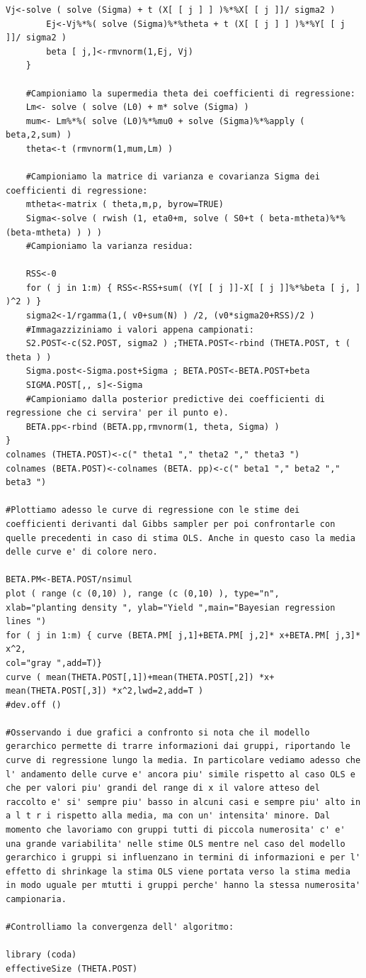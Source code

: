 \begin{lstlisting}[style=R]
        Vj<-solve ( solve (Sigma) + t (X[ [ j ] ] )%*%X[ [ j ]]/ sigma2 )
        Ej<-Vj%*%( solve (Sigma)%*%theta + t (X[ [ j ] ] )%*%Y[ [ j ]]/ sigma2 )
        beta [ j,]<-rmvnorm(1,Ej, Vj)
    }

    #Campioniamo la supermedia theta dei coefficienti di regressione:
    Lm<- solve ( solve (L0) + m* solve (Sigma) )
    mum<- Lm%*%( solve (L0)%*%mu0 + solve (Sigma)%*%apply ( beta,2,sum) )
    theta<-t (rmvnorm(1,mum,Lm) )

    #Campioniamo la matrice di varianza e covarianza Sigma dei coefficienti di regressione:
    mtheta<-matrix ( theta,m,p, byrow=TRUE)
    Sigma<-solve ( rwish (1, eta0+m, solve ( S0+t ( beta-mtheta)%*%(beta-mtheta) ) ) )
    #Campioniamo la varianza residua:

    RSS<-0
    for ( j in 1:m) { RSS<-RSS+sum( (Y[ [ j ]]-X[ [ j ]]%*%beta [ j, ] )^2 ) }
    sigma2<-1/rgamma(1,( v0+sum(N) ) /2, (v0*sigma20+RSS)/2 )
    #Immagazziziniamo i valori appena campionati:
    S2.POST<-c(S2.POST, sigma2 ) ;THETA.POST<-rbind (THETA.POST, t ( theta ) )
    Sigma.post<-Sigma.post+Sigma ; BETA.POST<-BETA.POST+beta
    SIGMA.POST[,, s]<-Sigma
    #Campioniamo dalla posterior predictive dei coefficienti di regressione che ci servira' per il punto e).
    BETA.pp<-rbind (BETA.pp,rmvnorm(1, theta, Sigma) )
}
colnames (THETA.POST)<-c(" theta1 "," theta2 "," theta3 ")
colnames (BETA.POST)<-colnames (BETA. pp)<-c(" beta1 "," beta2 "," beta3 ")

#Plottiamo adesso le curve di regressione con le stime dei coefficienti derivanti dal Gibbs sampler per poi confrontarle con quelle precedenti in caso di stima OLS. Anche in questo caso la media delle curve e' di colore nero.

BETA.PM<-BETA.POST/nsimul
plot ( range (c (0,10) ), range (c (0,10) ), type="n",
xlab="planting density ", ylab="Yield ",main="Bayesian regression lines ")
for ( j in 1:m) { curve (BETA.PM[ j,1]+BETA.PM[ j,2]* x+BETA.PM[ j,3]* x^2,
col="gray ",add=T)}
curve ( mean(THETA.POST[,1])+mean(THETA.POST[,2]) *x+
mean(THETA.POST[,3]) *x^2,lwd=2,add=T )
#dev.off ()

#Osservando i due grafici a confronto si nota che il modello gerarchico permette di trarre informazioni dai gruppi, riportando le curve di regressione lungo la media. In particolare vediamo adesso che l' andamento delle curve e' ancora piu' simile rispetto al caso OLS e che per valori piu' grandi del range di x il valore atteso del raccolto e' si' sempre piu' basso in alcuni casi e sempre piu' alto in a l t r i rispetto alla media, ma con un' intensita' minore. Dal momento che lavoriamo con gruppi tutti di piccola numerosita' c' e' una grande variabilita' nelle stime OLS mentre nel caso del modello gerarchico i gruppi si influenzano in termini di informazioni e per l' effetto di shrinkage la stima OLS viene portata verso la stima media in modo uguale per mtutti i gruppi perche' hanno la stessa numerosita' campionaria.

#Controlliamo la convergenza dell' algoritmo:

library (coda)
effectiveSize (THETA.POST)
\end{lstlisting}

